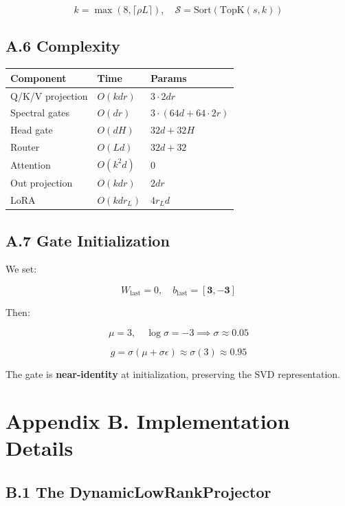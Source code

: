 \[
k = \max(8, \lceil \rho L \rceil), \quad
\mathcal{S} = \text{Sort}(\text{TopK}(s, k))
\tag{A.10}
\]

\subsection{A.6 Complexity}

\begin{table}[H]
\centering
\small
\begin{tabular}{lll}
\toprule
\textbf{Component} & \textbf{Time} & \textbf{Params} \\
\midrule
Q/K/V projection & $O(k d r)$ & $3 \cdot 2 d r$ \\
Spectral gates & $O(d r)$ & $3 \cdot (64d + 64 \cdot 2r)$ \\
Head gate & $O(d H)$ & $32d + 32H$ \\
Router & $O(L d)$ & $32d + 32$ \\
Attention & $O(k^2 d)$ & 0 \\
Out projection & $O(k d r)$ & $2 d r$ \\
LoRA & $O(k d r_L)$ & $4 r_L d$ \\
\bottomrule
\end{tabular}
\end{table}

\subsection{A.7 Gate Initialization}

We set:

\[
W_\text{last} = 0, \quad b_\text{last} = [\mathbf{3}, \mathbf{-3}]
\tag{A.11}
\]

Then:

\[
\mu = 3, \quad \log \sigma = -3 \implies \sigma \approx 0.05
\tag{A.12}
\]

\[
g = \sigma(\mu + \sigma \epsilon) \approx \sigma(3) \approx 0.95
\tag{A.13}
\]

The gate is \textbf{near-identity} at initialization, preserving the SVD 
representation.



\section{Appendix B. Implementation Details}

\subsection{B.1 The DynamicLowRankProjector}

